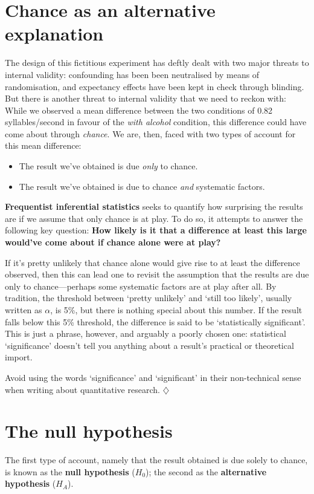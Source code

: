 \documentclass[a4paper]{tufte-book}\usepackage[]{graphicx}\usepackage[]{xcolor}
\newcommand{\term}[1]{\textbf{#1}}
\newcommand*{\parend}[1][$\diamondsuit$]{%
  \unskip\nobreak\hspace{1em plus 1fill}$\diamondsuit$%
}
\begin{document}
\section{Chance as an alternative explanation}
The design of this fictitious experiment has deftly dealt with
two major threats to internal validity:
confounding has been been neutralised by means of randomisation,
and expectancy effects have been kept in check through blinding.
But there is another threat to internal validity that we need
to reckon with:
While we observed a mean difference between the two conditions
of 0.82 syllables/second in favour of the \textit{with alcohol} condition,
this difference could have come about through \emph{chance}.
We are, then, faced with two types of account for this mean difference:

\begin{itemize}
  \item The result we've obtained is due \emph{only} to chance.
  \item The result we've obtained is due to chance \emph{and} systematic factors.
\end{itemize}

\term{Frequentist inferential statistics} seeks to quantify
how surprising the results are if we assume that only chance is at play.
To do so, it attempts to answer the following key question:
\textbf{How likely is it that a difference at least this large would've come about if chance alone were at play?}

If it's pretty unlikely that chance alone would give rise to 
at least the difference observed,
then this can lead one to revisit the assumption that the results are due
only to chance---perhaps some systematic factors are at play after all.
By tradition, the threshold between `pretty unlikely' and `still too likely',
usually written as $\alpha$, is 5\%,
but there is nothing special about this number.
If the result falls below this 5\% threshold,
the difference is said to be `statistically significant'.
This is just a phrase, however, and arguably a poorly chosen one: statistical `significance' doesn't tell you anything about a
result's practical or theoretical import.

Avoid using the words `significance' and `significant' in their non-technical 
sense when writing about quantitative research.
\parend

\section{The null hypothesis}
The first type of account, namely that the result obtained is due solely
to chance, is known as the \term{null hypothesis} ($H_0$);
the second as the \term{alternative hypothesis} ($H_A$).
\end{document}
